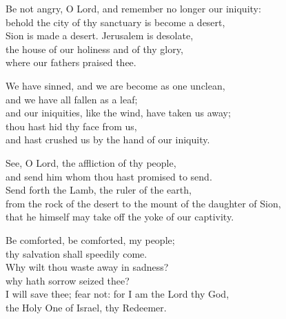 Be not angry, O Lord, and remember no longer our iniquity:\\
behold the city of thy sanctuary is become a desert,\\
Sion is made a desert. Jerusalem is desolate,\\
the house of our holiness and of thy glory,\\
where our fathers praised thee. %

We have sinned, and we are become as one unclean,\\
and we have all fallen as a leaf;\\
and our iniquities, like the wind, have taken us away;\\
thou hast hid thy face from us,\\
and hast crushed us by the hand of our iniquity. %

See, O Lord, the affliction of thy people,\\
and send him whom thou hast promised to send.\\
Send forth the Lamb, the ruler of the earth,\\
from the rock of the desert to the mount of the daughter of Sion,\\
that he himself may take off the yoke of our captivity. %

Be comforted, be comforted, my people;\\
thy salvation shall speedily come.\\
Why wilt thou waste away in sadness?\\
why hath sorrow seized thee?\\
I will save thee; fear not: for I am the Lord thy God,\\
the Holy One of Israel, thy Redeemer. %
